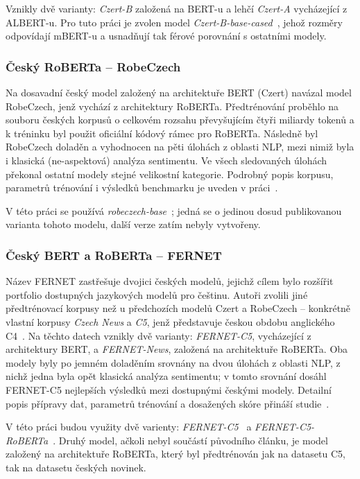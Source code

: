 Vznikly dvě varianty: \emph{Czert-B} založená na BERT-u a lehčí \emph{Czert-A} vycházející z ALBERT-u. Pro tuto práci je zvolen model \emph{Czert-B-base-cased}~\cite{CzertHugging}, jehož rozměry odpovídají mBERT-u a usnadňují tak férové porovnání s ostatními modely.

\subsubsection{Český RoBERTa -- RobeCzech}\label{RobeCzech}
Na dosavadní český model založený na architektuře BERT (Czert) navázal model RobeCzech, jenž vychází z architektury RoBERTa. Předtrénování proběhlo na souboru českých korpusů o celkovém rozsahu převyšujícím čtyři miliardy tokenů a k tréninku byl použit oficiální kódový rámec pro RoBERTa. Následně byl RobeCzech doladěn a vyhodnocen na pěti úlohách z oblasti NLP, mezi nimiž byla i klasická (ne-aspektová) analýza sentimentu. Ve všech sledovaných úlohách překonal ostatní modely stejné velikostní kategorie. Podrobný popis korpusu, parametrů trénování i výsledků benchmarku je uveden v práci~\cite{Straka_2021}.

V této práci se používá \emph{robeczech-base}~\cite{RobeCzech}; jedná se o jedinou dosud publikovanou varianta tohoto modelu, další verze zatím nebyly vytvořeny.

\subsubsection{Český BERT a RoBERTa -- FERNET}\label{FERNET}
Název FERNET zastřešuje dvojici českých modelů, jejichž cílem bylo rozšířit portfolio dostupných jazykových modelů pro češtinu. Autoři zvolili jiné předtrénovací korpusy než u předchozích modelů Czert a RobeCzech -- konkrétně vlastní korpusy \emph{Czech News} a \emph{C5}, jenž představuje českou obdobu anglického C4~\cite{JMLR:v21:20-074}. Na těchto datech vznikly dvě varianty: \emph{FERNET-C5}, vycházející z architektury BERT, a \emph{FERNET-News}, založená na architektuře RoBERTa. Oba modely byly po jemném doladěním srovnány na dvou úlohách z oblasti NLP, z nichž jedna byla opět klasická analýza sentimentu; v tomto srovnání dosáhl FERNET-C5 nejlepších výsledků mezi dostupnými českými modely. Detailní popis přípravy dat, parametrů trénování a dosažených skóre přináší studie~\cite{Lehe_ka_2021}.

V této práci budou využity dvě varienty: \emph{FERNET-C5}~\cite{FERNET-C5} a \emph{FERNET-C5-RoBERTa}~\cite{FERNET-C5-RoBERTa}. Druhý model, ačkoli nebyl součástí původního článku, je model založený na architektuře RoBERTa, který byl předtrénován jak na datasetu C5, tak na datasetu českých novinek.

